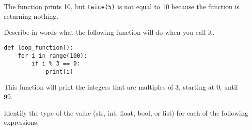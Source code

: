 \documentclass[12pt,answers]{exam}
\begin{document}
\begin{questions}
\begin{solution}
The function prints 10, but \lstinline{twice(5)} is not equal to 10 because the function is returning nothing.  
\end{solution}
\vfill

\question Describe in words what the following function will do when you call it.

\begin{lstlisting}
def loop_function():
    for i in range(100):
        if i % 3 == 0:
            print(i)
\end{lstlisting}

\begin{solution}
This function will print the integers that are multiples of 3, starting at 0, until 99. 
\end{solution}

\question Identify the type of the value (str, int, float, bool, or list) for each of the following expressions.
\end{questions}
\end{document}
